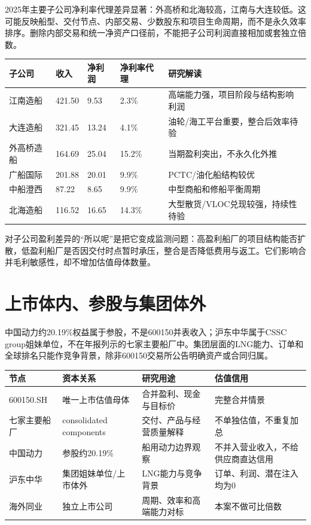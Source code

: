 2025年主要子公司净利率代理差异显著：外高桥和北海较高，江南与大连较低。这可能反映船型、交付节点、内部交易、少数股东和项目生命周期，而不是永久效率排序。删除内部交易和统一净资产口径前，不能把子公司利润直接相加或套独立倍数。

\begin{exhibitbox}[2025年主要子公司经营观察]
\small
\begin{tabularx}{\exhibitboxwidth}{L{2.4cm}R{2.3cm}R{2.3cm}R{2.1cm}X}
\toprule
\textbf{子公司} & \textbf{收入} & \textbf{净利润} & \textbf{净利率代理} & \textbf{研究解读} \\
\midrule
江南造船 & 421.50 & 9.53 & 2.3\% & 高端能力强，项目阶段与结构影响利润 \\
大连造船 & 321.45 & 13.24 & 4.1\% & 油轮/海工平台重要，整合后效率待验 \\
外高桥造船 & 164.69 & 25.04 & 15.2\% & 当期盈利突出，不永久化外推 \\
广船国际 & 201.88 & 20.01 & 9.9\% & PCTC/油化船结构较优 \\
中船澄西 & 87.22 & 8.65 & 9.9\% & 中型商船和修船平衡周期 \\
北海造船 & 116.52 & 16.65 & 14.3\% & 大型散货/VLOC兑现较强，持续性待验 \\
\bottomrule
\end{tabularx}
\end{exhibitbox}

对子公司盈利差异的“所以呢”是把它变成监测问题：高盈利船厂的项目结构能否扩散，低盈利船厂是否因交付时点暂时承压，整合是否降低费用与返工。它们影响合并毛利敏感性，却不增加估值母体数量。

\section{上市体内、参股与集团体外}

中国动力约20.19\%权益属于参股，不是600150并表收入；沪东中华属于CSSC group姐妹单位，不在年报列示的七家主要船厂中。集团层面的LNG能力、订单和全球排名只能作竞争背景，除非600150交易所公告明确资产或合同归属。

\begin{exhibitbox}[唯一估值母体与观察节点]
\small
\begin{tabularx}{\exhibitboxwidth}{L{3.2cm}L{3.0cm}L{3.2cm}X}
\toprule
\textbf{节点} & \textbf{资本关系} & \textbf{研究用途} & \textbf{估值信用} \\
\midrule
600150.SH & 唯一上市估值母体 & 合并盈利、现金与目标价 & 完整合并情景 \\
七家主要船厂 & consolidated components & 交付、产品与经营质量解释 & 不单独估值，不重复加总 \\
中国动力 & 参股约20.19\% & 船用动力边界观察 & 不并入营业收入，不给供应商直达信用 \\
沪东中华 & 集团姐妹单位/上市体外 & LNG能力与竞争背景 & 订单、利润、潜在注入均为0 \\
海外同业 & 独立上市公司 & 周期、效率和高端能力对标 & 本案不做可比倍数 \\
\bottomrule
\end{tabularx}
\end{exhibitbox}

